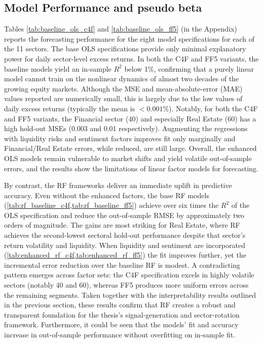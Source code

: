 \subsection{Model Performance and pseudo beta}
Tables \ref{tab:baseline_ols_c4f} and \ref{tab:baseline_ols_ff5} (in the Appendix) reports the forecasting performance for the eight model specifications for each of the 11 sectors. The base OLS specifications provide only minimal explanatory power for daily sector-level excess returns. In both the C4F and FF5 variants, the baseline models yield an in-sample $R^{2}$ below 1\%, confirming that a purely linear model cannot train on the nonlinear dynamics of almost two decades of the growing equity markets.  Although the MSE and mean-absolute-error (MAE) values reported are numerically small, this is largely due to the low values of daily excess returns (typically the mean is $<0.001\%$).  Notably, for both the C4F and FF5 variants, the Financial sector (40) and especially Real Estate (60) has a high hold-out MSEs (0.003 and 0.01 respectively).  Augmenting the regressions with liquidity risks and sentiment factors improves fit only marginally and Financial/Real Estate errors, while reduced, are still large. Overall, the enhanced OLS models remain vulnerable to market shifts and yield volatile out-of-sample errors, and the results show the limitations of linear factor models for forecasting.

By contrast, the RF frameworks deliver an immediate uplift in predictive accuracy. Even without the enhanced factors, the base RF models (\cref{tab:rf_baseline_c4f,tab:rf_baseline_ff5}) achieve over six times the $R^{2}$ of the OLS specification and reduce the out-of-sample RMSE by approximately two orders of magnitude. The gains are most striking for Real Estate, where RF achieves the second-lowest sectoral hold-out performance despite that sector's return volatility and liquidity.  When liquidity and sentiment are incorporated (\cref{tab:enhanced_rf_c4f,tab:enhanced_rf_ff5}) the fit improves further, yet the incremental error reduction over the baseline RF is modest. A contradicting pattern emerges across factor sets: the C4F specification excels in highly volatile sectors (notably 40 and 60), whereas FF5 produces more uniform errors across the remaining segments.  Taken together with the interpretability results outlined in the previous section, these results confirm that RF creates a robust and transparent foundation for the thesis's signal-generation and sector-rotation framework.  Furthermore, it could be seen that the models' fit and accuracy increase in out-of-sample performance without overfitting on in-sample fit.

